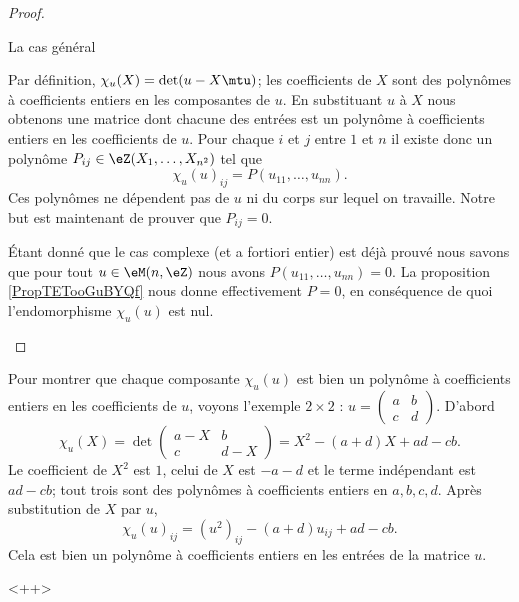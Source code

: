 \begin{proof}
\begin{subproof}
        \item[La cas général]

            Par définition, \( \chi_u(X)=\det(u-X\mtu)\); les coefficients de \( X\) sont des polynômes à coefficients entiers en les composantes de \( u\). En substituant \( u\) à \( X\) nous obtenons une matrice dont chacune des entrées est un polynôme à coefficients entiers en les coefficients de \( u\). Pour chaque \( i\) et \( j\) entre \( 1\) et \( n\) il existe donc un polynôme \( P_{ij}\in \eZ(X_1,\ldots, X_{n^2})\) tel que
            \begin{equation}
                \chi_u(u)_{ij}=P(u_{11},\ldots, u_{nn}).
            \end{equation}
            Ces polynômes ne dépendent pas de \( u\) ni du corps sur lequel on travaille. Notre but est maintenant de prouver que \( P_{ij}=0\).

            Étant donné que le cas complexe (et a fortiori entier) est déjà prouvé nous savons que pour tout \( u\in \eM(n,\eZ)\) nous avons \( P(u_{11},\ldots, u_{nn})=0\). La proposition \ref{PropTETooGuBYQf} nous donne effectivement \( P=0\), en conséquence de quoi l'endomorphisme \( \chi_u(u)\) est nul.

    \end{subproof}
\end{proof}

\begin{example}
    Pour montrer que chaque composante \( \chi_u(u)\) est bien un polynôme à coefficients entiers en les coefficients de \( u\), voyons l'exemple \( 2\times 2\) : \( u=\begin{pmatrix}
        a    &   b    \\ 
        c    &   d    
    \end{pmatrix}\). D'abord
    \begin{equation}
        \chi_u(X)=\det\begin{pmatrix}
            a-X    &   b    \\ 
            c    &   d-X    
        \end{pmatrix}=X^2-(a+d)X+ad-cb.
    \end{equation}
    Le coefficient de \( X^2\) est \( 1\), celui de \( X\) est \( -a-d\) et le terme indépendant est \( ad-cb\); tout trois sont des polynômes à coefficients entiers en \( a,b,c,d\). Après substitution de \( X\) par \( u\), 
    \begin{equation}
        \chi_u(u)_{ij}=(u^2)_{ij}-(a+d)u_{ij}+ad-cb.
    \end{equation}
    Cela est bien un polynôme à coefficients entiers en les entrées de la matrice \( u\).
\end{example}
<++>

